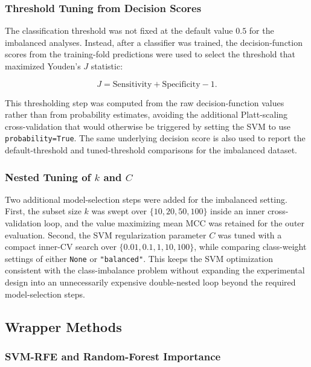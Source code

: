 \subsubsection{Threshold Tuning from Decision Scores}

The classification threshold was not fixed at the default value $0.5$ for the imbalanced analyses. Instead, after a classifier was trained, the decision-function scores from the training-fold predictions were used to select the threshold that maximized Youden's $J$ statistic:

\begin{equation}
    J = \text{Sensitivity} + \text{Specificity} - 1.
\end{equation}

This thresholding step was computed from the raw decision-function values rather than from probability estimates, avoiding the additional Platt-scaling cross-validation that would otherwise be triggered by setting the SVM to use \texttt{probability=True}. The same underlying decision score is also used to report the default-threshold and tuned-threshold comparisons for the imbalanced dataset.

\subsubsection{Nested Tuning of $k$ and $C$}

Two additional model-selection steps were added for the imbalanced setting. First, the subset size $k$ was swept over $\{10, 20, 50, 100\}$ inside an inner cross-validation loop, and the value maximizing mean MCC was retained for the outer evaluation. Second, the SVM regularization parameter $C$ was tuned with a compact inner-CV search over $\{0.01, 0.1, 1, 10, 100\}$, while comparing class-weight settings of either \texttt{None} or \texttt{"balanced"}. This keeps the SVM optimization consistent with the class-imbalance problem without expanding the experimental design into an unnecessarily expensive double-nested loop beyond the required model-selection steps.

\subsection{Wrapper Methods}

\subsubsection{SVM-RFE and Random-Forest Importance}

